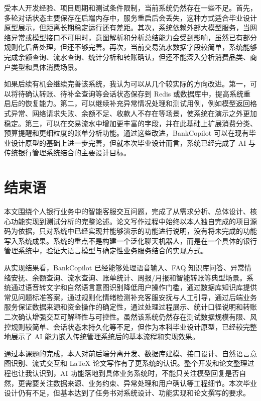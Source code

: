 \documentclass[bachelor, print]{xduthesis}
\begin{document}
受本人开发经验、项目周期和测试条件限制，当前系统仍然存在一些不足。首先，多轮对话状态主要保存在后端内存中，服务重启后会丢失，这种方式适合毕业设计原型展示，但距离长期稳定运行还有差距。其次，系统依赖外部大模型服务，当网络异常或模型接口不可用时，意图解析和分析总结能力会受到影响，虽然已有部分规则化后备处理，但还不够完善。再次，当前交易流水数据字段较简单，系统能够完成余额查询、流水查询、统计分析和转账确认，但还不能深入分析消费品类、商户类型和具体消费场景。

如果后续有机会继续完善该系统，我认为可以从几个较实际的方向改进。第一，可以将待确认转账、待补全查询等会话状态保存到 Redis 或数据库中，提高系统重启后的恢复能力。第二，可以继续补充异常情况处理和测试用例，例如模型返回格式异常、网络请求失败、余额不足、收款人不存在等场景，使系统在演示之外更加稳定。第三，可以在交易流水中增加更丰富的字段，并在此基础上扩展消费分类、预算提醒和更细粒度的账单分析功能。通过这些改进，BankCopilot 可以在现有毕业设计原型的基础上进一步完善，但就本次毕业设计而言，系统已经完成了 AI 与传统银行管理系统结合的主要设计目标。

\chapter{结束语}

本文围绕个人银行业务中的智能客服交互问题，完成了从需求分析、总体设计、核心功能实现到测试分析的完整论述。论文写作过程中始终以本人独自完成的项目源码为依据，只对系统中已经实现并能够演示的功能进行说明，没有将未完成的功能写入系统成果。系统的重点不是构建一个泛化聊天机器人，而是在一个具体的银行管理系统中，验证大语言模型与确定性业务服务结合的实现方式。

从实现结果看，BankCopilot 已经能够处理语音输入、FAQ 知识库问答、异常情绪安抚、余额查询、流水查询、账单统计、周报/月报和智能转账等典型场景。系统通过语音转文字和自然语言意图识别降低用户操作门槛，通过数据库知识库提供常见问题标准答案，通过规则化情绪检测补充客服安抚与人工引导，通过后端业务服务保证数据来源和资金操作的确定性，通过处理过程展示、统计口径说明和转账二次确认增强交互可解释性与可控性。虽然该系统仍然存在测试数据规模有限、风控规则较简单、会话状态未持久化等不足，但作为本科毕业设计原型，已经较完整地展示了 AI 能力嵌入传统管理系统后的基本流程和实现效果。

通过本课题的完成，本人对前后端分离开发、数据库建模、接口设计、自然语言意图识别、流式交互和 LaTeX 论文写作有了更系统的认识。整个开发和论文整理过程也让我认识到，AI 功能落地到具体业务系统时，不能只关注模型回复是否自然，更需要关注数据来源、业务约束、异常处理和用户确认等工程细节。本次毕业设计仍有不足，但基本达到了任务书对系统设计、功能实现和论文撰写的要求。
\end{document}
